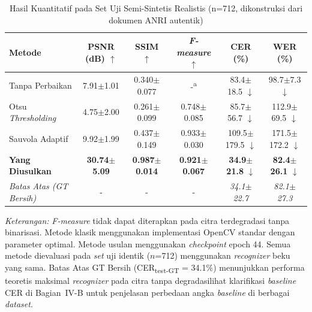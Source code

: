 \documentclass[journal]{IEEEtran}
\begin{document}
\begin{table}[!t]
\renewcommand{\arraystretch}{1.3}
\caption{Hasil Kuantitatif pada Set Uji Semi-Sintetis Realistis (n=712, dikonstruksi dari dokumen ANRI autentik)}
\label{table_synthetic_results}
\centering
\begin{tabular}{|l|c|c|c|c|c|}
\hline
\textbf{Metode} & \textbf{PSNR (dB) $\uparrow$} & \textbf{SSIM $\uparrow$} & \textbf{\textit{F-measure} $\uparrow$} & \textbf{CER (\%)} & \textbf{WER (\%)} \\
\hline
Tanpa Perbaikan & 7.91$\pm$1.01 & 0.340$\pm$0.077 & -\textsuperscript{a} & 83.4$\pm$18.5 $\downarrow$ & 98.7$\pm$7.3 $\downarrow$ \\
Otsu \textit{Thresholding} & 4.75$\pm$2.00 & 0.261$\pm$0.099 & 0.748$\pm$0.085 & 85.7$\pm$56.7 $\downarrow$ & 112.9$\pm$69.5 $\downarrow$ \\
Sauvola Adaptif & 9.92$\pm$1.99 & 0.437$\pm$0.149 & 0.933$\pm$0.030 & 109.5$\pm$179.5 $\downarrow$ & 171.5$\pm$172.2 $\downarrow$ \\
\hline
\textbf{Yang Diusulkan} & \textbf{30.74$\pm$5.09} & \textbf{0.987$\pm$0.014} & \textbf{0.921$\pm$0.067} & \textbf{34.9$\pm$21.8} $\downarrow$ & \textbf{82.4$\pm$26.1} $\downarrow$ \\
\hline
\textit{Batas Atas (GT Bersih)} & - & - & - & \textit{34.1$\pm$22.7} & \textit{82.1$\pm$27.3} \\
\hline
\end{tabular}
\textit{Keterangan:} \textit{F-measure} tidak dapat diterapkan pada citra terdegradasi tanpa binarisasi. Metode klasik menggunakan implementasi OpenCV standar dengan parameter optimal. Metode usulan menggunakan \textit{checkpoint} epoch 44. Semua metode dievaluasi pada \textit{set} uji identik ($n$=712) menggunakan \textit{recognizer} beku yang sama. Batas Atas GT Bersih (CER\textsubscript{test-GT} = 34.1\%) menunjukkan performa teoretis maksimal \textit{recognizer} pada citra tanpa degradasi\textemdash lihat klarifikasi \textit{baseline} CER di Bagian~IV-B untuk penjelasan perbedaan angka \textit{baseline} di berbagai \textit{dataset}.
\end{table}
\end{document}
